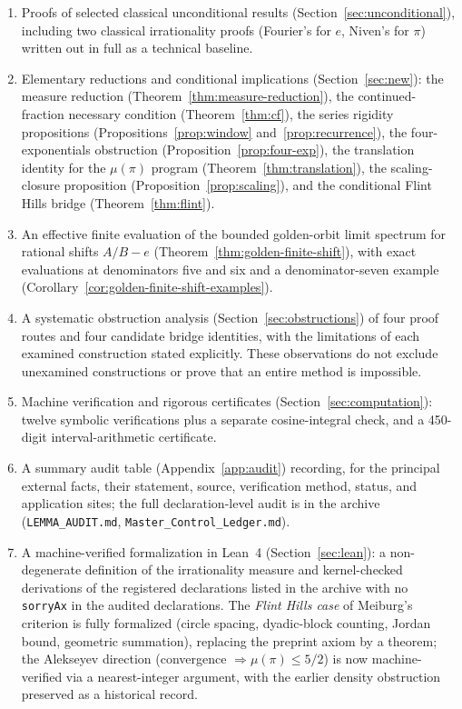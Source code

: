\documentclass[11pt]{amsart}
\theoremstyle{definition}
\theoremstyle{remark}
\numberwithin{equation}{section}
\newcommand{\irr}{\mu}
\newcommand{\ee}{e}
\begin{document}
\begin{enumerate}
\item Proofs of selected classical unconditional results (Section~\ref{sec:unconditional}), including two classical irrationality proofs (Fourier's for $\ee$, Niven's for $\pi$) written out in full as a technical baseline.
\item Elementary reductions and conditional implications (Section~\ref{sec:new}): the measure reduction (Theorem~\ref{thm:measure-reduction}), the continued-fraction necessary condition (Theorem~\ref{thm:cf}), the series rigidity propositions (Propositions~\ref{prop:window} and~\ref{prop:recurrence}), the four-exponentials obstruction (Proposition~\ref{prop:four-exp}), the translation identity for the $\irr(\pi)$ program (Theorem~\ref{thm:translation}), the scaling-closure proposition (Proposition~\ref{prop:scaling}), and the conditional Flint Hills bridge (Theorem~\ref{thm:flint}).
\item An effective finite evaluation of the bounded golden-orbit limit
spectrum for rational shifts $A/B-e$ (Theorem~\ref{thm:golden-finite-shift}),
with exact evaluations at denominators five and six and a denominator-seven
example (Corollary~\ref{cor:golden-finite-shift-examples}).
\item A systematic obstruction analysis (Section~\ref{sec:obstructions}) of four proof routes and four candidate bridge identities, with the limitations of each examined construction stated explicitly. These observations do not exclude unexamined constructions or prove that an entire method is impossible.
\item Machine verification and rigorous certificates (Section~\ref{sec:computation}): twelve symbolic verifications plus a separate cosine-integral check, and a 450-digit interval-arithmetic certificate.
\item A summary audit table (Appendix~\ref{app:audit}) recording, for the principal external facts, their statement, source, verification method, status, and application sites; the full declaration-level audit is in the archive (\texttt{LEMMA\_AUDIT.md}, \texttt{Master\_Control\_Ledger.md}).
\item A machine-verified formalization in Lean~4 (Section~\ref{sec:lean}): a non-degenerate definition of the irrationality measure and kernel-checked derivations of the registered declarations listed in the archive with no \texttt{sorryAx} in the audited declarations. The \emph{Flint Hills case} of Meiburg's criterion is fully formalized (circle spacing, dyadic-block counting, Jordan bound, geometric summation), replacing the preprint axiom by a theorem; the Alekseyev direction (convergence $\Rightarrow\irr(\pi)\le5/2$) is now machine-verified via a nearest-integer argument, with the earlier density obstruction preserved as a historical record.

\end{enumerate}
\end{document}
